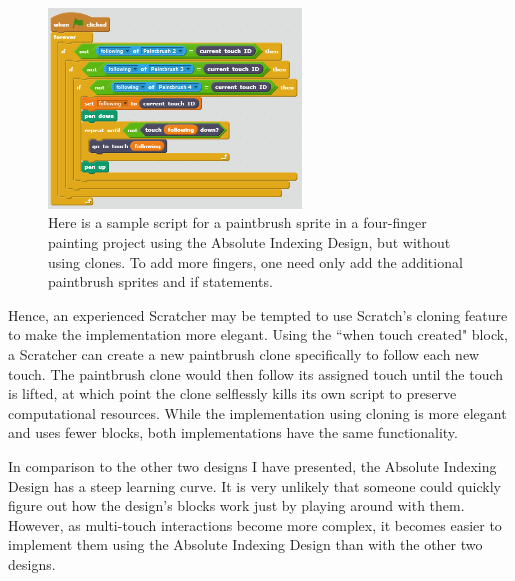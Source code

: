 \begin{figure}
\centering
\includegraphics[width=0.6\textwidth]{images/TediousMultiFingerPainting.PNG}
\caption[Sample Absolute Indexing Design Script for Multi-Finger Painting]
{Here is a sample script for a paintbrush sprite in a four-finger painting project using the Absolute Indexing Design, but without using clones. To add more fingers, one need only add the additional paintbrush sprites and if statements.}
\label{TediousMultiFingerPainting}
\end{figure}

Hence, an experienced Scratcher may be tempted to use Scratch's cloning feature to make the implementation more elegant. Using the ``when touch created" block, a Scratcher can create a new paintbrush clone specifically to follow each new touch. The paintbrush clone would then follow its assigned touch until the touch is lifted, at which point the clone selflessly kills its own script to preserve computational resources. While the implementation using cloning is more elegant and uses fewer blocks, both implementations have the same functionality.

In comparison to the other two designs I have presented, the Absolute Indexing Design has a steep learning curve. It is very unlikely that someone could quickly figure out how the design's blocks work just by playing around with them. However, as multi-touch interactions become more complex, it becomes easier to implement them using the Absolute Indexing Design than with the other two designs.  

